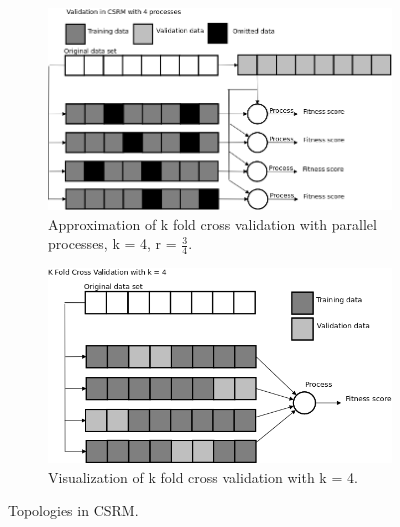 \begin{figure}
	\begin{subfigure}{0.5\textwidth}\label{fig:csrmkfold}
    \includegraphics[width=\textwidth,height=\textheight,keepaspectratio]{figures/validationcsrm.png}
    \caption{Approximation of k fold cross validation with parallel processes, k = 4,  r = $\frac{3}{4}$.}
    \end{subfigure}
	\begin{subfigure}{0.5\textwidth}    \label{fig:kfold}

    \centering
    \includegraphics[width=\textwidth,height=\textheight,keepaspectratio]{figures/kfold.png}
    \caption{Visualization of k fold cross validation with k = 4.}
    \label{fig:kfold}
    \end{subfigure}%
    \caption{Topologies in CSRM.}
    \label{fig:ckfold}
 \end{figure}
